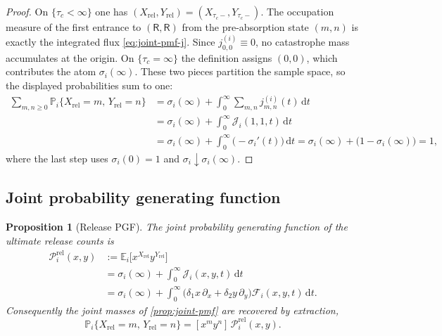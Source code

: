 \documentclass[11pt]{article}
\newcommand{\Prob}{\mathbb P}
\newcommand{\E}{\mathbb E}
\newcommand{\dd}{\mathrm d}
\newcommand{\R}{\mathsf R}
\newcommand{\Xrel}{X_{\mathrm{rel}}}
\newcommand{\Yrel}{Y_{\mathrm{rel}}}
\theoremstyle{plain}
\newtheorem{proposition}{Proposition}
\theoremstyle{definition}
\theoremstyle{remark}
\begin{document}
\begin{proof}
On $\{\tau_c<\infty\}$ one has $(\Xrel,\Yrel)=(X_{\tau_c-},Y_{\tau_c-})$. The occupation measure of
the first entrance to $(\R,\R)$ from the pre-absorption state $(m,n)$ is exactly the integrated
flux \cref{eq:joint-pmf-j}. Since $j_{0,0}^{(i)}\equiv 0$, no catastrophe mass accumulates at the
origin. On $\{\tau_c=\infty\}$ the definition assigns $(0,0)$, which contributes the atom
$\sigma_i(\infty)$. These two pieces partition the sample space, so the displayed probabilities
sum to one:
\begin{align*}
\sum_{m,n\ge 0}
\Prob_i\{\Xrel=m,\,\Yrel=n\}
&=
\sigma_i(\infty)
+
\int_0^\infty
\sum_{m,n}
j_{m,n}^{(i)}(t)\,
\dd t
\\
&=
\sigma_i(\infty)
+
\int_0^\infty
\mathcal J_i(1,1,t)\,
\dd t
\\
&=
\sigma_i(\infty)
+
\int_0^\infty
\bigl(-\sigma_i'(t)\bigr)\,
\dd t
=
\sigma_i(\infty)
+
\bigl(1-\sigma_i(\infty)\bigr)
=1,
\end{align*}
where the last step uses $\sigma_i(0)=1$ and $\sigma_i\downarrow\sigma_i(\infty)$.
\end{proof}

\subsection{Joint probability generating function}

\begin{proposition}[Release PGF]
\label{prop:release-pgf}
The joint probability generating function of the ultimate release counts is
\begin{equation}
\label{eq:release-pgf}
\begin{aligned}
\mathcal P_i^{\mathrm{rel}}(x,y)
&:=
\E_i\bigl[x^{\Xrel}y^{\Yrel}\bigr]
\\
&=
\sigma_i(\infty)
+
\int_0^\infty
\mathcal J_i(x,y,t)\,
\dd t
\\
&=
\sigma_i(\infty)
+
\int_0^\infty
\bigl(
\delta_1 x\,\partial_x
+
\delta_2 y\,\partial_y
\bigr)
\mathcal F_i(x,y,t)\,
\dd t.
\end{aligned}
\end{equation}
Consequently the joint masses of \cref{prop:joint-pmf} are recovered by extraction,
\begin{equation}
\label{eq:extract}
\Prob_i\{\Xrel=m,\,\Yrel=n\}
=
[x^my^n]\,\mathcal P_i^{\mathrm{rel}}(x,y).
\end{equation}
\end{proposition}
\end{document}

